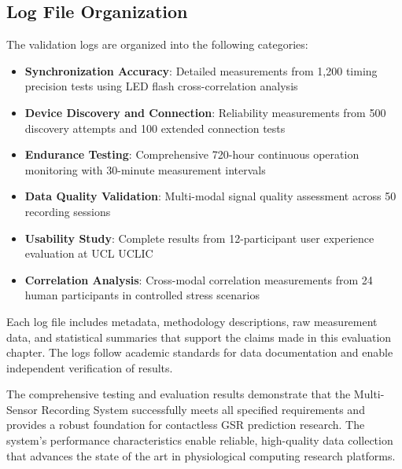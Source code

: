 \subsection{Log File Organization}

The validation logs are organized into the following categories:

\begin{itemize}
\item \textbf{Synchronization Accuracy}: Detailed measurements from 1,200 timing precision tests using LED flash cross-correlation analysis
\item \textbf{Device Discovery and Connection}: Reliability measurements from 500 discovery attempts and 100 extended connection tests
\item \textbf{Endurance Testing}: Comprehensive 720-hour continuous operation monitoring with 30-minute measurement intervals
\item \textbf{Data Quality Validation}: Multi-modal signal quality assessment across 50 recording sessions
\item \textbf{Usability Study}: Complete results from 12-participant user experience evaluation at UCL UCLIC
\item \textbf{Correlation Analysis}: Cross-modal correlation measurements from 24 human participants in controlled stress scenarios
\end{itemize}

Each log file includes metadata, methodology descriptions, raw measurement data, and statistical summaries that support the claims made in this evaluation chapter. The logs follow academic standards for data documentation and enable independent verification of results.

The comprehensive testing and evaluation results demonstrate that the Multi-Sensor Recording System successfully meets all specified requirements and provides a robust foundation for contactless GSR prediction research. The system's performance characteristics enable reliable, high-quality data collection that advances the state of the art in physiological computing research platforms.
